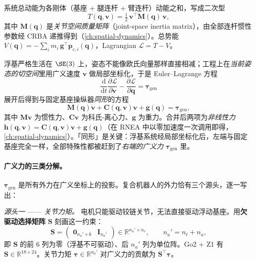 \begin{derivation}[统一动力学方程的变分推导]
系统总动能为各刚体（基座 + 腿连杆 + 臂连杆）动能之和，写成二次型
\begin{equation}
  T(\mathbf q,\mathbf v)=\tfrac12\,\mathbf v^\top\mathbf M(\mathbf q)\,\mathbf v,
  \label{eq:umm-kinetic}
\end{equation}
其中 $\mathbf M(\mathbf q)$ 是\emph{关节空间质量矩阵}（joint-space inertia matrix），由全部连杆惯性参数经 CRBA 递推得到（\cref{ch:spatial-dynamics}）。总势能 $V(\mathbf q)=-\sum_i m_i\,\mathbf g^\top\mathbf p_{c,i}(\mathbf q)$，Lagrangian $\mathcal L=T-V$。

浮基严格生活在 $\SE(3)$ 上，姿态不能像欧氏向量那样直接相减；工程上在\emph{当前姿态的切空间}里用广义速度 $\mathbf v$ 做局部坐标化，于是 Euler--Lagrange 方程
\begin{equation}
  \frac{\mathrm d}{\mathrm dt}\frac{\partial\mathcal L}{\partial\mathbf v}-\frac{\partial\mathcal L}{\partial\mathbf q}=\boldsymbol\tau_{\text{gen}}
  \label{eq:umm-el}
\end{equation}
展开后得到与固定基座操纵器\emph{同形}的方程
\begin{equation}
  \mathbf M(\mathbf q)\dot{\mathbf v}+\mathbf C(\mathbf q,\mathbf v)\mathbf v+\mathbf g(\mathbf q)=\boldsymbol\tau_{\text{gen}},
  \label{eq:umm-manip}
\end{equation}
其中 $\mathbf M\dot{\mathbf v}$ 为惯性力、$\mathbf C\mathbf v$ 为科氏-离心力、$\mathbf g$ 为重力。合并后两项为\emph{非线性力} $\mathbf h(\mathbf q,\mathbf v)=\mathbf C(\mathbf q,\mathbf v)\mathbf v+\mathbf g(\mathbf q)$（在 RNEA 中以零加速度一次调用即得，\cref{ch:spatial-dynamics}）。「同形」是关键：浮基系统经局部坐标化后，左端与固定基座完全一样，全部特殊性都被赶到了\emph{右端的广义力} $\boldsymbol\tau_{\text{gen}}$ 里。
\end{derivation}

\paragraph{广义力的三类分解。}
$\boldsymbol\tau_{\text{gen}}$ 是所有外力在广义坐标上的投影。复合机器人的外力恰有三个源头，逐一写出：

\emph{源头一 —— 关节力矩。}\;
电机只能驱动铰链关节，无法直接驱动浮动基座。用\textbf{欠驱动选择矩阵} $\mathbf S$ 刻画这一约束：
\begin{equation}
  \mathbf S=\begin{pmatrix}\mathbf 0_{n_a'\times6} & \mathbf I_{n_a'}\end{pmatrix}\in\mathbb R^{n_a'\times n_v},
  \qquad n_a'=n_\ell+n_a,
  \label{eq:umm-S}
\end{equation}
即 $\mathbf S$ 的前 $6$ 列为零（浮基不可驱动）、后 $n_a'$ 列为单位阵。Go2 + Z1 有 $\mathbf S\in\mathbb R^{18\times24}$。关节力矩 $\boldsymbol\tau\in\mathbb R^{n_a'}$ 对广义力的贡献为 $\mathbf S^\top\boldsymbol\tau$。

